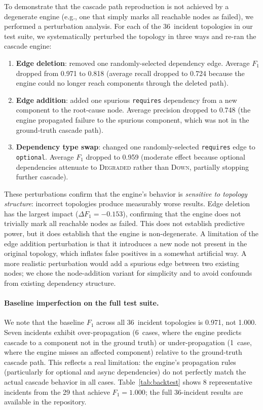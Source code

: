 \documentclass[10pt,twocolumn]{article}
\begin{document}
To demonstrate that the cascade path reproduction is not achieved
by a degenerate engine (e.g., one that simply marks all reachable
nodes as failed), we performed a perturbation analysis. For each
of the 36~incident topologies in our test suite, we systematically
perturbed the topology in three ways and re-ran the cascade engine:

\begin{enumerate}[nosep]
\item \textbf{Edge deletion}: removed one randomly-selected
  dependency edge. Average $F_1$ dropped from 0.971 to 0.818
  (average recall dropped to 0.724 because the engine could no
  longer reach components through the deleted path).
\item \textbf{Edge addition}: added one spurious \texttt{requires}
  dependency from a new component to the root-cause node. Average
  precision dropped to 0.748 (the engine propagated failure to
  the spurious component, which was not in the ground-truth
  cascade path).
\item \textbf{Dependency type swap}: changed one randomly-selected
  \texttt{requires} edge to \texttt{optional}. Average $F_1$
  dropped to 0.959 (moderate effect because optional dependencies
  attenuate to \textsc{Degraded} rather than \textsc{Down},
  partially stopping further cascade).
\end{enumerate}

These perturbations confirm that the engine's behavior is
\emph{sensitive to topology structure}: incorrect topologies
produce measurably worse results. Edge deletion has the largest
impact ($\Delta F_1 = -0.153$), confirming that the engine does
not trivially mark all reachable nodes as failed. This does not
establish predictive power, but it does establish that the engine
is non-degenerate.
A limitation of the edge addition perturbation is that it
introduces a new node not present in the original topology,
which inflates false positives in a somewhat artificial way.
A more realistic perturbation would add a spurious edge between
two existing nodes; we chose the node-addition variant for
simplicity and to avoid confounds from existing dependency
structure.

\paragraph{Baseline imperfection on the full test suite.}
We note that the baseline $F_1$ across all 36~incident topologies
is 0.971, not 1.000. Seven incidents exhibit over-propagation
(6~cases, where the engine predicts cascade to a component not
in the ground truth) or under-propagation (1~case, where the
engine misses an affected component) relative to the
ground-truth cascade path. This reflects a real limitation:
the engine's propagation rules (particularly for optional and
async dependencies) do not perfectly match the actual cascade
behavior in all cases. Table~\ref{tab:backtest} shows 8 representative incidents from
the 29 that achieve $F_1 = 1.000$; the full 36-incident results
are available in the repository.
\end{document}
